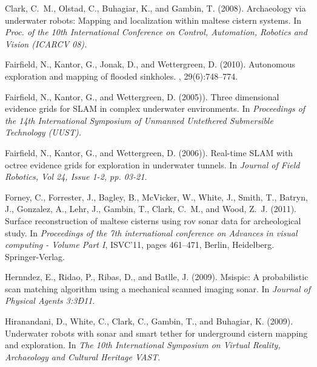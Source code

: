 \documentclass{llncs}
\begin{document}


\begin{thebibliography}{9}
Clark, C.~M., Olstad, C., Buhagiar, K., and Gambin, T. (2008).
\newblock Archaeology via underwater robots: Mapping and localization within
  maltese cistern systems.
\newblock In {\em Proc. of the 10th International Conference on Control,
  Automation, Robotics and Vision (ICARCV 08).}

Fairfield, N., Kantor, G., Jonak, D., and Wettergreen, D. (2010).
\newblock Autonomous exploration and mapping of flooded sinkholes.
, 29(6):748--774.

Fairfield, N., Kantor, G., and Wettergreen, D. (2005)).
\newblock Three dimensional evidence grids for {SLAM} in complex underwater
  environments.
\newblock In {\em Proceedings of the 14th International Symposium of Unmanned
  Untethered Submersible Technology (UUST).}

Fairfield, N., Kantor, G., and Wettergreen, D. (2006)).
\newblock Real-time {SLAM} with octree evidence grids for exploration in
  underwater tunnels.
\newblock In {\em Journal of Field Robotics, Vol 24, Issue 1-2, pp. 03-21.}

Forney, C., Forrester, J., Bagley, B., McVicker, W., White, J., Smith, T.,
  Batryn, J., Gonzalez, A., Lehr, J., Gambin, T., Clark, C.~M., and Wood, Z.~J.
  (2011).
\newblock Surface reconstruction of maltese cisterns using rov sonar data for
  archeological study.
\newblock In {\em Proceedings of the 7th international conference on Advances
  in visual computing - Volume Part I}, ISVC'11, pages 461--471, Berlin,
  Heidelberg. Springer-Verlag.

Hernndez, E., Ridao, P., Ribas, D., and Batlle, J. (2009).
\newblock Msispic: A probabilistic scan matching algorithm using a mechanical
  scanned imaging sonar.
\newblock In {\em Journal of Physical Agents 3:3Ð11}.

Hiranandani, D., White, C., Clark, C., Gambin, T., and Buhagiar, K. (2009).
\newblock Underwater robots with sonar and smart tether for underground cistern
  mapping and exploration.
\newblock In {\em The 10th International Symposium on Virtual Reality,
  Archaeology and Cultural Heritage VAST}.


\end{thebibliography}
\end{document}
